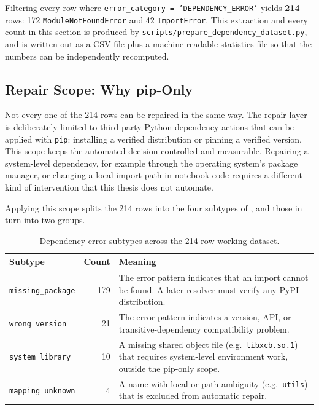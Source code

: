 Filtering every row where \texttt{error\_category = 'DEPENDENCY\_ERROR'}
yields \textbf{214} rows: 172 \texttt{ModuleNotFoundError} and 42
\texttt{ImportError}. This extraction and every count in this section is
produced by \texttt{scripts/prepare\_dependency\_dataset.py}, and is written
out as a CSV file plus a machine-readable statistics file so that the
numbers can be independently recomputed.

\subsection{Repair Scope: Why pip-Only}
\label{sec:pd-scope}

Not every one of the 214 rows can be repaired in the same way. The repair
layer is deliberately limited to third-party Python dependency actions that
can be applied with \texttt{pip}: installing a verified distribution or
pinning a verified version. This scope keeps the automated decision controlled
and measurable. Repairing a system-level dependency, for example through the
operating system's package manager, or changing a local import path in notebook
code requires a different kind of intervention that this thesis does not
automate.

Applying this scope splits the 214 rows into the four subtypes of
, and those in turn into two groups.

\begin{table}[htbp]
  \centering
  \begin{tabular}{|l|r|p{6.3cm}|}
    \hline
    \textbf{Subtype} & \textbf{Count} & \textbf{Meaning} \\
    \hline
    \texttt{missing\_package} & 179 & The error pattern indicates that an import cannot be found. A later resolver must verify any PyPI distribution. \\
    \hline
    \texttt{wrong\_version} & 21 & The error pattern indicates a version, API, or transitive-dependency compatibility problem. \\
    \hline
    \texttt{system\_library} & 10 & A missing shared object file (e.g.\ \texttt{libxcb.so.1}) that requires system-level environment work, outside the pip-only scope. \\
    \hline
    \texttt{mapping\_unknown} & 4 & A name with local or path ambiguity (e.g.\ \texttt{utils}) that is excluded from automatic repair. \\
    \hline
  \end{tabular}
  \caption{Dependency-error subtypes across the 214-row working dataset.}
  \label{tab:pd-subtypes}
\end{table}

